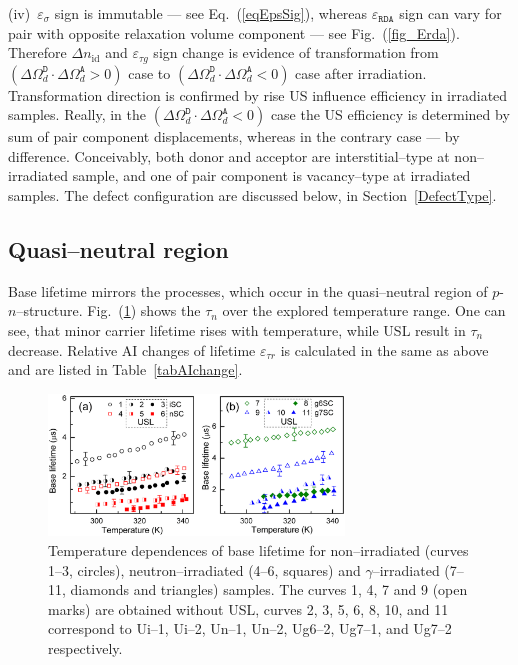 \documentclass[aip,jap, amsmath,amssymb,reprint]{revtex4-1}
\begin{document}
\noindent
(iv)~$\varepsilon_{\sigma}$ sign is immutable --- see Eq.~(\ref{eqEpsSig}),
whereas $\varepsilon_{\mathtt{RDA}}$ sign can vary for pair with opposite relaxation volume component --- see Fig.~(\ref{fig_Erda}).
Therefore $\Delta n_{\mathrm{id}}$ and $\varepsilon_{\tau g}$ sign change is evidence of transformation
from $(\Delta\Omega_d^\mathtt{D}\cdot\Delta\Omega_d^\mathtt{A}>0)$  case to
$(\Delta\Omega_d^\mathtt{D}\cdot\Delta\Omega_d^\mathtt{A}<0)$ case after irradiation.
Transformation direction is confirmed by rise US influence efficiency in irradiated samples.
Really, in the $(\Delta\Omega_d^\mathtt{D}\cdot\Delta\Omega_d^\mathtt{A}<0)$ case the US efficiency is determined by sum of pair component displacements,
whereas in the contrary case  --- by difference.
Conceivably, both donor and acceptor are interstitial--type at non--irradiated sample, and one of pair component is vacancy--type at irradiated samples.
The defect configuration are discussed below, in Section~\ref{DefectType}.


\subsection{Quasi--neutral region\label{Base}}

Base lifetime mirrors the processes, which occur in the quasi--neutral region  of $p$-$n$--structure.
Fig.~(\ref{fig_TAUr}) shows the  $\tau_n$  over the explored temperature range.
One can see, that minor carrier lifetime rises with temperature,
while USL result in $\tau_n$ decrease.
Relative AI changes of lifetime $\varepsilon_{\tau r}$ is calculated in the same as above
and are listed in Table~\ref{tabAIchange}.

\begin{figure}
\includegraphics[width=0.7\textwidth]{olikhFig6}%
\caption{\label{fig_TAUr}
Temperature dependences of base lifetime for non--irradiated (curves 1--3, circles),
neutron--irradiated (4--6, squares) and $\gamma$--irradiated (7--11, diamonds and triangles) samples.
The curves 1, 4, 7 and 9 (open marks) are obtained without USL,
curves 2, 3, 5, 6, 8, 10, and 11 correspond to
Ui--1, Ui--2, Un--1, Un--2, Ug6--2, Ug7--1, and Ug7--2 respectively.
}%
\end{figure}
\end{document}
